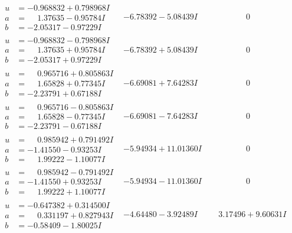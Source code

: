 \documentclass[1p]{elsarticle_modified}
\theoremstyle{definition}
\begin{document}
$$\begin{array}{c|c|c}
\begin{aligned}
u &= -0.968832 + 0.798968 I \\
a &= \phantom{-}1.37635 - 0.95784 I \\
b &= -2.05317 - 0.97229 I\end{aligned}
 & -6.78392 - 5.08439 I & \phantom{-0.000000 } 0 \\ \hline\begin{aligned}
u &= -0.968832 - 0.798968 I \\
a &= \phantom{-}1.37635 + 0.95784 I \\
b &= -2.05317 + 0.97229 I\end{aligned}
 & -6.78392 + 5.08439 I & \phantom{-0.000000 } 0 \\ \hline\begin{aligned}
u &= \phantom{-}0.965716 + 0.805863 I \\
a &= \phantom{-}1.65828 + 0.77345 I \\
b &= -2.23791 + 0.67188 I\end{aligned}
 & -6.69081 + 7.64283 I & \phantom{-0.000000 } 0 \\ \hline\begin{aligned}
u &= \phantom{-}0.965716 - 0.805863 I \\
a &= \phantom{-}1.65828 - 0.77345 I \\
b &= -2.23791 - 0.67188 I\end{aligned}
 & -6.69081 - 7.64283 I & \phantom{-0.000000 } 0 \\ \hline\begin{aligned}
u &= \phantom{-}0.985942 + 0.791492 I \\
a &= -1.41550 - 0.93253 I \\
b &= \phantom{-}1.99222 - 1.10077 I\end{aligned}
 & -5.94934 + 11.01360 I & \phantom{-0.000000 } 0 \\ \hline\begin{aligned}
u &= \phantom{-}0.985942 - 0.791492 I \\
a &= -1.41550 + 0.93253 I \\
b &= \phantom{-}1.99222 + 1.10077 I\end{aligned}
 & -5.94934 - 11.01360 I & \phantom{-0.000000 } 0 \\ \hline\begin{aligned}
u &= -0.647382 + 0.314500 I \\
a &= \phantom{-}0.331197 + 0.827943 I \\
b &= -0.58409 - 1.80025 I\end{aligned}
 & -4.64480 - 3.92489 I & \phantom{-}3.17496 + 9.60631 I \\ \hline\begin{aligned}

\end{aligned}
\end{array}$$
\end{document}
